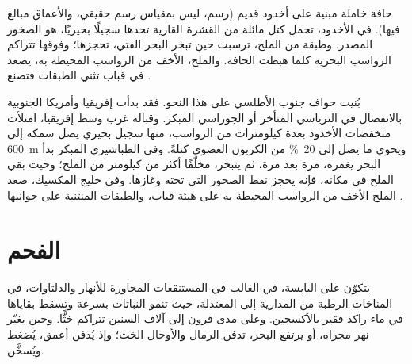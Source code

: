 \begin{omfigure}

{\small حافة خاملة مبنية على أخدود قديم (رسم، ليس بمقياس رسم حقيقي، والأعماق
مبالغ فيها). في الأخدود، تحمل كتل مائلة من القشرة القارية تحدها
 سجيلًا بحيريًا، هو الصخور المصدر. وطبقة من الملح، ترسبت
حين تبخر البحر الفتي، تحجزها؛ وفوقها تتراكم الرواسب البحرية
كلما هبطت الحافة. والملح، الأخف من الرواسب المحيطة به، يصعد
في قباب تثني الطبقات فتصنع .}
\end{omfigure}

بُنيت حواف جنوب الأطلسي على هذا النحو. فقد بدأت إفريقيا وأمريكا الجنوبية
بالانفصال في الترياسي المتأخر أو الجوراسي المبكر. وقبالة
غرب وسط إفريقيا، امتلأت منخفضات الأخدود بعدة كيلومترات من
الرواسب، منها سجيل بحيري يصل سمكه إلى \qty{600}{m} ويحوي ما يصل إلى
\qty{20}{\percent} من الكربون العضوي كتلةً. وفي الطباشيري المبكر بدأ البحر
يغمره، مرة بعد مرة، ثم يتبخر، مخلّفًا أكثر من
كيلومتر من الملح؛ وحيث بقي الملح في مكانه، فإنه يحجز نفط
الصخور التي تحته وغازها. وفي خليج المكسيك، صعد الملح الأخف من
الرواسب المحيطة به على هيئة قباب، والطبقات المنثنية على جوانبها
.

\section{الفحم}

يتكوّن  على اليابسة، في الغالب في المستنقعات المجاورة للأنهار والدلتاوات، في
المناخات الرطبة من المدارية إلى المعتدلة، حيث تنمو النباتات بسرعة وتسقط بقاياها
في ماء راكد فقير بالأكسجين. وعلى مدى قرون إلى آلاف السنين تتراكم
خثًّا. وحين يغيّر نهر مجراه، أو يرتفع البحر، تدفن الرمال والأوحال
الخث؛ وإذ يُدفن أعمق، يُضغط ويُسخَّن.

